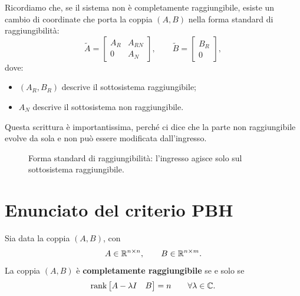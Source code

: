Ricordiamo che, se il sistema non è completamente raggiungibile, esiste un cambio di coordinate che porta la coppia \((A,B)\) nella forma standard di raggiungibilità:
\begin{equation}
\tilde A=
\begin{bmatrix}
A_R & A_{RN}\\
0 & A_N
\end{bmatrix},
\qquad
\tilde B=
\begin{bmatrix}
B_R\\
0
\end{bmatrix},
\label{eq:L13_standard_reach}
\end{equation}
dove:
\begin{itemize}
    \item \((A_R,B_R)\) descrive il sottosistema raggiungibile;
    \item \(A_N\) descrive il sottosistema non raggiungibile.
\end{itemize}

Questa scrittura è importantissima, perché ci dice che la parte non raggiungibile evolve da sola e non può essere modificata dall’ingresso.

\begin{figure}[H]
\centering
{}
\caption{Forma standard di raggiungibilità: l’ingresso agisce solo sul sottosistema raggiungibile.}
\end{figure}

\section{Enunciato del criterio PBH}

\begin{lemma}
Sia data la coppia \((A,B)\), con
\[
A\in\mathbb{R}^{n\times n}, \qquad B\in\mathbb{R}^{n\times m}.
\]
La coppia \((A,B)\) è \textbf{completamente raggiungibile} se e solo se
\begin{equation}
\operatorname{rank}
\begin{bmatrix}
A-\lambda I & B
\end{bmatrix}
=n
\qquad \forall \lambda\in\mathbb{C}.
\label{eq:L13_PBH}
\end{equation}
\end{lemma}

